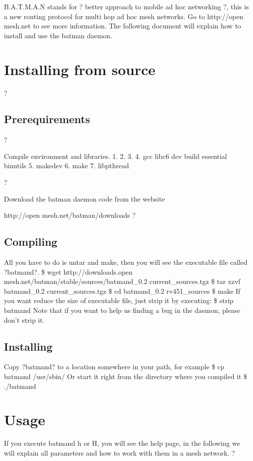 \documentclass[
	12pt,
	a4paper,
	twoside,
	english,
	headsepline,
	footnosepline,
	automark,
	normalheadings,
	openany,
	cleardoubleplain,
	abstracton,
	idxtotoc,
	liststotoc,
	bibtotoc,
 	BCOR8mm,
]{scrartcl}
\title{\dctitle}
\author{\dcauthorfirstname~\dcauthorlastname}
\begin{document}
\maketitle
B.A.T.M.A.N stands for ? better approach to mobile ad hoc networking ?, this is a new  routing protocol for multi hop ad hoc mesh networks. Go to http://open mesh.net to see  more information. The following document will explain how to install and use the batman daemon.


\section{Installing from source}
?

\subsection{Prerequirements}
?

Compile environment and libraries. 1. 2. 3. 4. gcc  libc6 dev build essential  binutils 5. makedev 6. make 7. libpthread

?

Download the batman daemon code from the website

 http://open mesh.net/batman/downloads
?

\subsection{Compiling}
All you have to do is untar and make, then you will see the executable file called ?batmand?. \$ wget http://downloads.open mesh.net/batman/stable/sources/batmand\_0.2  current\_sources.tgz \$ tar xzvf batmand\_0.2 current\_sources.tgz \$ cd batmand\_0.2 rv451\_sources \$ make If you want reduce the size of executable file, just strip it by executing:  \$ strip batmand Note that if you want to help us finding a bug in the daemon, please don't strip it.

\subsection{Installing}
Copy ?batmand? to a location somewhere in your path, for example \$ cp batmand /usr/sbin/ Or start it right from the directory where you compiled it \$ ./batmand

\section{Usage}
If you execute batmand  h or  H, you will see the help page, in the following we will explain  all parameters and how to work with them in a mesh network.
?
\end{document}
